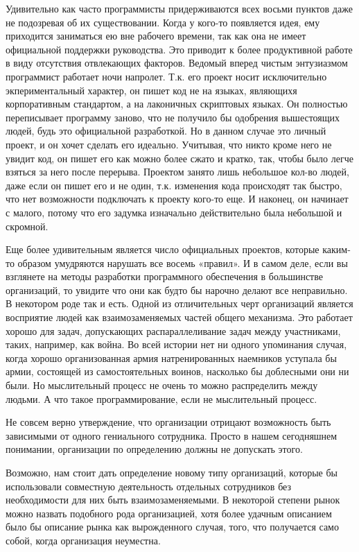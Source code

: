 \documentclass[ebook,12pt,oneside,openany]{memoir}
\begin{document}
Удивительно как часто программисты придерживаются всех восьми пунктов
даже не подозревая об их существовании. Когда у кого-то появляется
идея, ему приходится заниматься ею вне рабочего времени, так как она
не имеет официальной поддержки руководства. Это приводит к более
продуктивной работе в виду отсутствия отвлекающих факторов. Ведомый
вперед чистым энтузиазмом программист работает ночи напролет. Т.к. его
проект носит исключительно экпериментальный характер, он пишет код не
на языках, являющихя корпоративным стандартом, а на лаконичных
скриптовых языках. Он полностью переписывает программу заново, что не
получило бы одобрения вышестоящих людей, будь это официальной
разработкой. Но в данном случае это личный проект, и он хочет сделать
его идеально. Учитывая, что никто кроме него не увидит код, он пишет
его как можно более сжато и кратко, так, чтобы было легче взяться за
него после перерыва. Проектом занято лишь небольшое кол-во людей, даже
если он пишет его и не один, т.к. изменения кода происходят так
быстро, что нет возможности подключать к проекту кого-то еще. И
наконец, он начинает с малого, потому что его задумка изначально
действительно была небольшой и скромной.

Еще более удивительным является число официальных проектов, которые
каким-то образом умудряются нарушать все восемь «правил». И в самом
деле, если вы взглянете на методы разработки программного обеспечения
в большинстве организаций, то увидите что они как будто бы нарочно
делают все неправильно. В некотором роде так и есть. Одной из
отличительных черт организаций является восприятие людей как
взаимозаменяемых частей общего механизма. Это работает хорошо для
задач, допускающих распараллеливание задач между участниками, таких,
например, как война. Во всей истории нет ни одного упоминания случая,
когда хорошо организованная армия натренированных наемников уступала
бы армии, состоящей из самостоятельных воинов, насколько бы доблесными
они ни были. Но мыслительный процесс не очень то можно распределить
между людьми. А что такое программирование, если не мыслительный
процесс.

Не совсем верно утверждение, что организации отрицают возможность быть
зависимыми от одного гениального сотрудника. Просто в нашем
сегодняшнем понимании, организации по определению должны не допускать
этого.

Возможно, нам стоит дать определение новому типу организаций, которые
бы использовали совместную деятельность отдельных сотрудников без
необходимости для них быть взаимозаменяемыми. В некоторой степени
рынок можно назвать подобного рода организацией, хотя более удачным
описанием было бы описание рынка как вырожденного случая, того, что
получается само собой, когда организация неуместна.
\end{document}
